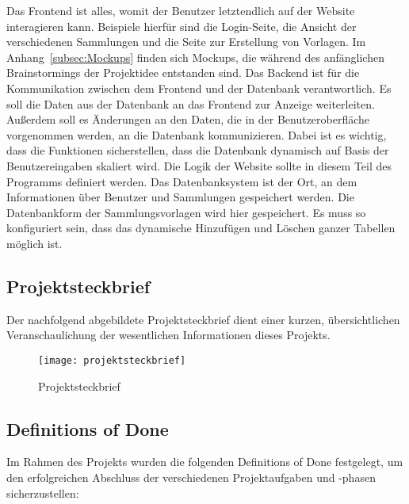 Das Frontend ist alles, womit der Benutzer letztendlich auf der Website interagieren kann.
Beispiele hierfür sind die Login-Seite, die Ansicht der verschiedenen Sammlungen und die Seite zur Erstellung von Vorlagen.
Im Anhang~\ref{subsec:Mockups} finden sich Mockups, die während des anfänglichen Brainstormings der Projektidee entstanden sind.
Das Backend ist für die Kommunikation zwischen dem Frontend und der Datenbank verantwortlich.
Es soll die Daten aus der Datenbank an das Frontend zur Anzeige weiterleiten.
Außerdem soll es Änderungen an den Daten, die in der Benutzeroberfläche vorgenommen werden, an die Datenbank kommunizieren.
Dabei ist es wichtig, dass die Funktionen sicherstellen, dass die Datenbank dynamisch auf Basis der Benutzereingaben skaliert wird.
Die Logik der Website sollte in diesem Teil des Programms definiert werden.
Das Datenbanksystem ist der Ort, an dem Informationen über Benutzer und Sammlungen gespeichert werden.
Die Datenbankform der Sammlungsvorlagen wird hier gespeichert.
Es muss so konfiguriert sein, dass das dynamische Hinzufügen und Löschen ganzer Tabellen möglich ist.

\newpage
\subsection{Projektsteckbrief}\label{subsec:projektsteckbrief}
Der nachfolgend abgebildete Projektsteckbrief dient einer kurzen, übersichtlichen Veranschaulichung der wesentlichen Informationen dieses Projekts.

\begin{figure}[H]
    \centering
    \texttt{[image: projektsteckbrief]}
    \caption{Projektsteckbrief}\label{fig:projektsteckbrief}
\end{figure}

\newpage
\subsection{Definitions of Done}\label{subsec:definitions-of-done}



Im Rahmen des Projekts wurden die folgenden Definitions of Done festgelegt, um den erfolgreichen Abschluss der verschiedenen Projektaufgaben und -phasen sicherzustellen:

